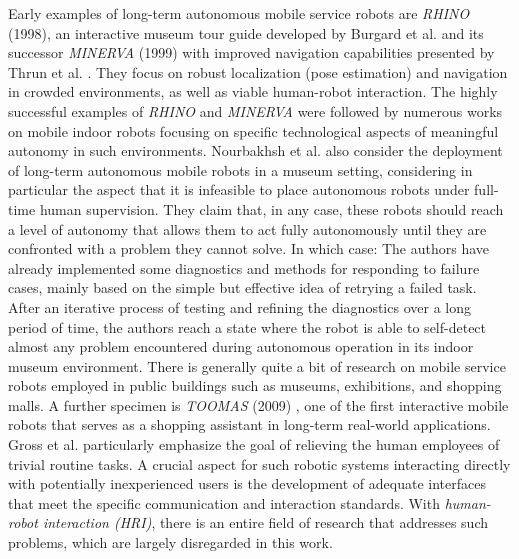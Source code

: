 \documentclass[english, master, utf8]{base/thesis_KBS}
\begin{document}
\noindent
Early examples of long-term autonomous mobile service robots are \textit{RHINO} (1998), an interactive museum tour guide developed by Burgard et al. \cite{Burgard:1998}
and its successor \textit{MINERVA} (1999) with improved navigation capabilities presented by Thrun et al. \cite{Thrun:1999}.
They focus on robust localization (pose estimation) and navigation in crowded environments, as well as viable human-robot interaction.\newline
The highly successful examples of \textit{RHINO} and \textit{MINERVA} were followed by numerous works on mobile indoor robots focusing on specific technological aspects of
meaningful autonomy in such environments.
Nourbakhsh et al. \cite{Nourbakhsh:2003} also consider the deployment of long-term autonomous mobile robots in a museum setting, considering in particular the aspect that
it is infeasible to place autonomous robots under full-time human supervision. They claim that, in any case, these robots should reach a level of autonomy that allows them to act
fully autonomously until they are confronted with a problem they cannot solve. In which case:  \cite{Nourbakhsh:2003} The authors have already implemented some diagnostics and methods for responding to failure cases,
mainly based on the simple but effective idea of retrying a failed task. After an iterative process of testing and refining the diagnostics over a long period of time, the
authors reach a state where the robot is able to self-detect almost any problem encountered during autonomous operation in its indoor museum environment.\newline
There is generally quite a bit of research on mobile service robots employed in public buildings such as museums, exhibitions, and shopping malls.
A further specimen is \textit{TOOMAS} (2009) \cite{Gross:2009}, one of the first interactive mobile robots that serves as a shopping assistant in long-term real-world applications.
Gross et al. particularly emphasize the goal of relieving the human employees of trivial routine tasks. A crucial aspect for such robotic systems interacting directly with
potentially inexperienced users is the development of adequate interfaces that meet the specific communication and interaction standards. With \textit{human-robot interaction (HRI)},
there is an entire field of research that addresses such problems, which are largely disregarded in this work.\newline
\end{document}
